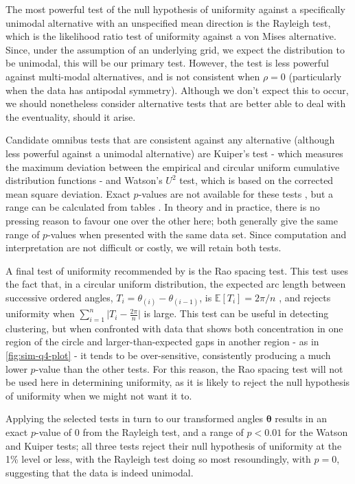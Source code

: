 \documentclass[../../ArchStats.tex]{subfiles}
\begin{document}
The most powerful test of the null hypothesis of uniformity against a specifically unimodal alternative with an unspecified mean direction is the Rayleigh test, which is the likelihood ratio test of uniformity against a von Mises alternative. Since, under the assumption of an underlying grid, we expect the distribution to be unimodal, this will be our primary test. However, the test is less powerful against multi-modal alternatives, and is not consistent when $\rho = 0$ (particularly when the data has antipodal symmetry). Although we don't expect this to occur, we should nonetheless consider alternative tests that are better able to deal with the eventuality, should it arise.

Candidate omnibus tests that are consistent against any alternative (although less powerful against a unimodal alternative) are Kuiper's test - which measures the maximum deviation between the empirical and circular uniform cumulative distribution functions - and Watson's $U^2$ test, which is based on the corrected mean square deviation. Exact $p$-values are not available for these tests , but a range can be calculated from tables . In theory and in practice, there is no pressing reason to favour one over the other here; both generally give the same range of $p$-values when presented with the same data set. Since computation and interpretation are not difficult or costly, we will retain both tests.

A final test of uniformity recommended by \cite{Pewsey2014} is the Rao spacing test. This test uses the fact that, in a circular uniform distribution, the expected arc length between successive ordered angles, $T_i = \theta_{(i)} - \theta_{(i-1)}$, is 
$\mathbb{E}\left[T_i\right] = 2\pi/n$ , and rejects uniformity when $\sum_{i=1}^n \vert T_i - \frac{2\pi}{n}\vert$ is large. This test can be useful in detecting clustering, but when confronted with data that shows both concentration in one region of the circle and larger-than-expected gaps in another region - as in \ref{fig:sim-q4-plot} - it tends to be over-sensitive, consistently producing a much lower $p$-value than the other tests. For this reason, the Rao spacing test will not be used here in determining uniformity, as it is likely to reject the null hypothesis of uniformity when we might not want it to. 

Applying the selected tests in turn to our transformed angles $\mathbf{\theta}$ results in an exact $p$-value of 0 from the Rayleigh test, and a range of $p < 0.01$ for the Watson and Kuiper tests; all three tests reject their null hypothesis of uniformity at the 1\% level or less, with the Rayleigh test doing so most resoundingly, with $p=0$, suggesting that the data is indeed unimodal. 
\end{document}
